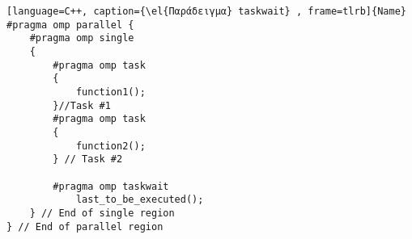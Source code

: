 \begin{lstlisting}[language=C++, caption={\el{Παράδειγμα} taskwait} , frame=tlrb]{Name}
#pragma omp parallel {
	#pragma omp single
	{
		#pragma omp task
		{
			function1();
		}//Task #1
		#pragma omp task
		{
			function2();
		} // Task #2

		#pragma omp taskwait
			last_to_be_executed();
	} // End of single region
} // End of parallel region
\end{lstlisting}
